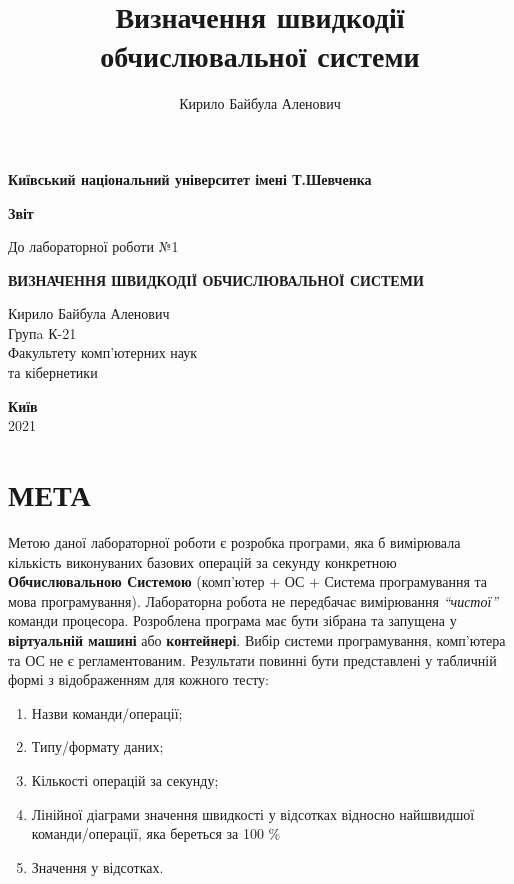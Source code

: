 \documentclass[a4paper,12pt]{report}
\author{Кирило Байбула Аленович}
\title{Визначення швидкодії обчислювальної системи}
\begin{document}
\begin{titlepage}
	\begin{center}
		\Large
		\textbf{Київський національний університет імені Т.Шевченка}
		\vspace{5cm}

		\Huge
		\textbf{Звіт}

		\LARGE
		До лабораторної роботи №1
		\vspace{0.5cm}

		\textbf{ВИЗНАЧЕННЯ ШВИДКОДІЇ ОБЧИСЛЮВАЛЬНОЇ СИСТЕМИ}
		\vfill
	\end{center}

	\begin{FlushRight}
		Кирило Байбула Аленович\\
		Групa К-21\\
		Факультету комп’ютерних наук \\
		та кібернетики
	\end{FlushRight}

	\vspace{0.5cm}

	\begin{center}
		\textbf{Київ} \\
		2021
	\end{center}

\end{titlepage}
\clearpage

\section{МЕТА}
Метою даної лабораторної роботи є розробка програми, яка б вимірювала кількість виконуваних базових операцій за секунду конкретною \textbf{Обчислювальною Системою} (комп’ютер + ОС + Система програмування та мова програмування). Лабораторна робота не передбачає вимірювання \textit{“чистої”} команди процесора. Розроблена програма має бути зібрана та запущена у \textbf{віртуальній машині} або \textbf{контейнері}. Вибір системи програмування, комп’ютера та ОС не є регламентованим. Результати повинні бути представлені у табличній формі з відображенням для кожного тесту:
\begin{enumerate}
    \item{Назви команди/операції;}
    \item{Типу/формату даних;}
    \item{Кількості операцій за секунду;}
    \item{Лінійної діаграми значення швидкості у відсотках відносно найшвидшої команди/операції, яка береться за 100 \%}
    \item{Значення у відсотках.}
\end{enumerate}
\end{document}
